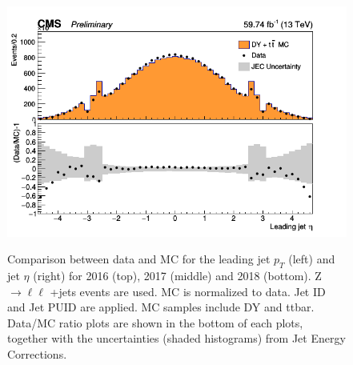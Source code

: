 \begin{figure}[!h]
\includegraphics[width=0.49\linewidth]{Figures/Jets/leadingJet_Eta_2018June24.png} \\

\caption{Comparison between data and MC for the leading jet $p_T$ (left) and jet $\eta$ (right) for 2016 (top), 2017 (middle) and 2018 (bottom). Z$\rightarrow \ell\ell$ +jets events are used. 
MC is normalized to data. Jet ID and Jet PUID are applied. MC samples include DY and ttbar. Data/MC ratio plots are shown in the bottom of each plots, together with the uncertainties (shaded histograms) from Jet Energy Corrections.
\label{fig:jets}}
\end{figure}

